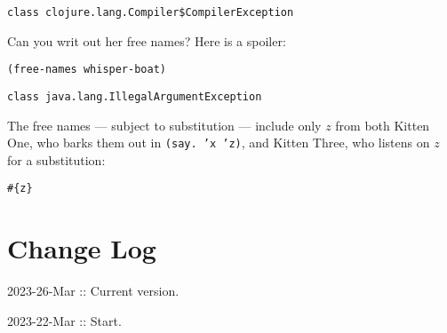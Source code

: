 \documentclass[10pt,oneside,x11names]{article}
\theoremstyle{definition}
\theoremstyle{warning}
\begin{document}
\begin{verbatim}
class clojure.lang.Compiler$CompilerException
\end{verbatim}


Can you writ out her free names? Here is a spoiler:

\vskip 0.26cm
\begin{verbatim}
(free-names whisper-boat)
\end{verbatim}

\begin{verbatim}
class java.lang.IllegalArgumentException
\end{verbatim}


The free names --- subject to substitution --- include only \(z\)
from both Kitten One, who barks them out in \texttt{(say. 'x 'z)}, and
Kitten Three, who listens on \(z\) for a substitution:

\begin{verbatim}
#{z}
\end{verbatim}

\section{Change Log}
\label{sec:org92e8508}

2023-26-Mar :: Current version.

2023-22-Mar :: Start.
\end{document}
